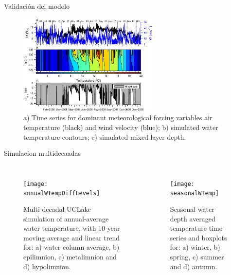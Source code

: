 \documentclass[
10pt,
aspectratio=169,
]{beamer}
\begin{document}
\begin{frame}{Validación del modelo}
\vspace{-0.22cm}
\begin{figure}[!ht]
  \begin{center}
      \includegraphics[width=0.63\textwidth]{straAnaNewNew2}
    \caption{\tiny a) Time series for dominant meteorological forcing variables air temperature (black) and wind velocity (blue); b) simulated water temperature contours; c) simulated mixed layer depth.}
    \label{straAna1}
  \end{center}
\end{figure}
\end{frame}

\begin{frame}{Simulacion multidecaadas}
\vspace{-0.4cm}
\begin{columns}
\begin{figure}[!htbp]
  \begin{center}
      \texttt{[image: annualWTempDiffLevels]}
    \caption{\tiny Multi-decadal UCLake simulation of annual-average water temperature, with 10-year moving average and linear trend for: a) water column average, b) epilimnion, c) metalimnion and d) hypolimnion.}
    \label{annualWTempDiffLevels}
  \end{center}
\end{figure}
\begin{figure}[!htbp]
  \begin{center}
      \texttt{[image: seasonalWTemp]}
    \caption{\tiny Seasonal water-depth averaged temperature time-series and boxplots for: a) winter, b) spring, c) summer and d) autumn.}
    \label{seasonalWTemp}
  \end{center}
\end{figure}
\end{columns}
\end{frame}
\end{document}
